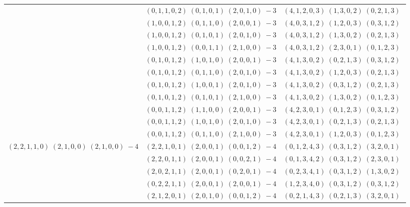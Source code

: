 \documentclass[11pt]{article}
\begin{document}
\begin{longtable}[l]{|c|c|c|}
 \cline{2-3} 
 & $(0 ,1 ,1 ,0 ,2) \;(0 ,1 ,0 ,1) \;(2 ,0 ,1 ,0) \;-3$ & $(4 ,1 ,2 ,0 ,3) \;(1 ,3 ,0 ,2) \;(0 ,2 ,1 ,3) \;$\\ 
 \cline{2-3} 
 & $(1 ,0 ,0 ,1 ,2) \;(0 ,1 ,1 ,0) \;(2 ,0 ,0 ,1) \;-3$ & $(4 ,0 ,3 ,1 ,2) \;(1 ,2 ,0 ,3) \;(0 ,3 ,1 ,2) \;$\\ 
 \cline{2-3} 
 & $(1 ,0 ,0 ,1 ,2) \;(0 ,1 ,0 ,1) \;(2 ,0 ,1 ,0) \;-3$ & $(4 ,0 ,3 ,1 ,2) \;(1 ,3 ,0 ,2) \;(0 ,2 ,1 ,3) \;$\\ 
 \cline{2-3} 
 & $(1 ,0 ,0 ,1 ,2) \;(0 ,0 ,1 ,1) \;(2 ,1 ,0 ,0) \;-3$ & $(4 ,0 ,3 ,1 ,2) \;(2 ,3 ,0 ,1) \;(0 ,1 ,2 ,3) \;$\\ 
 \cline{2-3} 
 & $(0 ,1 ,0 ,1 ,2) \;(1 ,0 ,1 ,0) \;(2 ,0 ,0 ,1) \;-3$ & $(4 ,1 ,3 ,0 ,2) \;(0 ,2 ,1 ,3) \;(0 ,3 ,1 ,2) \;$\\ 
 \cline{2-3} 
 & $(0 ,1 ,0 ,1 ,2) \;(0 ,1 ,1 ,0) \;(2 ,0 ,1 ,0) \;-3$ & $(4 ,1 ,3 ,0 ,2) \;(1 ,2 ,0 ,3) \;(0 ,2 ,1 ,3) \;$\\ 
 \cline{2-3} 
 & $(0 ,1 ,0 ,1 ,2) \;(1 ,0 ,0 ,1) \;(2 ,0 ,1 ,0) \;-3$ & $(4 ,1 ,3 ,0 ,2) \;(0 ,3 ,1 ,2) \;(0 ,2 ,1 ,3) \;$\\ 
 \cline{2-3} 
 & $(0 ,1 ,0 ,1 ,2) \;(0 ,1 ,0 ,1) \;(2 ,1 ,0 ,0) \;-3$ & $(4 ,1 ,3 ,0 ,2) \;(1 ,3 ,0 ,2) \;(0 ,1 ,2 ,3) \;$\\ 
 \cline{2-3} 
 & $(0 ,0 ,1 ,1 ,2) \;(1 ,1 ,0 ,0) \;(2 ,0 ,0 ,1) \;-3$ & $(4 ,2 ,3 ,0 ,1) \;(0 ,1 ,2 ,3) \;(0 ,3 ,1 ,2) \;$\\ 
 \cline{2-3} 
 & $(0 ,0 ,1 ,1 ,2) \;(1 ,0 ,1 ,0) \;(2 ,0 ,1 ,0) \;-3$ & $(4 ,2 ,3 ,0 ,1) \;(0 ,2 ,1 ,3) \;(0 ,2 ,1 ,3) \;$\\ 
 \cline{2-3} 
 & $(0 ,0 ,1 ,1 ,2) \;(0 ,1 ,1 ,0) \;(2 ,1 ,0 ,0) \;-3$ & $(4 ,2 ,3 ,0 ,1) \;(1 ,2 ,0 ,3) \;(0 ,1 ,2 ,3) \;$\\ \hline\multirow[t]{31}{*}{ $(2 ,2 ,1 ,1 ,0) \;(2 ,1 ,0 ,0) \;(2 ,1 ,0 ,0) \;-4$ }  & $(2 ,2 ,1 ,0 ,1) \;(2 ,0 ,0 ,1) \;(0 ,0 ,1 ,2) \;-4$ & $(0 ,1 ,2 ,4 ,3) \;(0 ,3 ,1 ,2) \;(3 ,2 ,0 ,1) \;$\\ 
 \cline{2-3} 
 & $(2 ,2 ,0 ,1 ,1) \;(2 ,0 ,0 ,1) \;(0 ,0 ,2 ,1) \;-4$ & $(0 ,1 ,3 ,4 ,2) \;(0 ,3 ,1 ,2) \;(2 ,3 ,0 ,1) \;$\\ 
 \cline{2-3} 
 & $(2 ,0 ,2 ,1 ,1) \;(2 ,0 ,0 ,1) \;(0 ,2 ,0 ,1) \;-4$ & $(0 ,2 ,3 ,4 ,1) \;(0 ,3 ,1 ,2) \;(1 ,3 ,0 ,2) \;$\\ 
 \cline{2-3} 
 & $(0 ,2 ,2 ,1 ,1) \;(2 ,0 ,0 ,1) \;(2 ,0 ,0 ,1) \;-4$ & $(1 ,2 ,3 ,4 ,0) \;(0 ,3 ,1 ,2) \;(0 ,3 ,1 ,2) \;$\\ 
 \cline{2-3} 
 & $(2 ,1 ,2 ,0 ,1) \;(2 ,0 ,1 ,0) \;(0 ,0 ,1 ,2) \;-4$ & $(0 ,2 ,1 ,4 ,3) \;(0 ,2 ,1 ,3) \;(3 ,2 ,0 ,1) \;$\\ 

\end{longtable}
\end{document}
